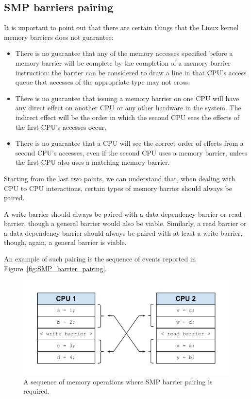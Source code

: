 \subsection{SMP barriers pairing}

It is important to point out that there are certain things that the Linux kernel memory
barriers does not guarantee:

\begin{itemize}
\item There is no guarantee that any of the memory accesses specified before a memory barrier
will be complete by the completion of a memory barrier instruction: the barrier can be
considered to draw a line in that CPU's access queue that accesses of the appropriate type
may not cross.
\item There is no guarantee that issuing a memory barrier on one CPU will have any direct
effect on another CPU or any other hardware in the system. The indirect effect will be the
order in which the second CPU sees the effects of the first CPU's accesses occur.
\item There is no guarantee that a CPU will see the correct order of effects from a second
CPU's accesses, even if the second CPU uses a memory barrier, unless the first CPU also
uses a matching memory barrier.
\end{itemize}

Starting from the last two points, we can understand that, when dealing with CPU to CPU 
interactions, certain types of memory barrier should always be paired.

A write barrier should always be paired with a data dependency barrier or read barrier,
though a general barrier would also be viable. Similarly, a read barrier or a data
dependency barrier should always be paired with at least a write barrier, though,
again, a general barrier is viable.

An example of such pairing is the sequence of events reported in 
Figure~\vref{fig:SMP_barrier_pairing}.

\begin{figure}[htbp]
    \includegraphics[width=\columnwidth]{images/SMP_barrier_pairing}
    \caption{A sequence of memory operations where SMP barrier pairing is required.}
    \label{fig:SMP_barrier_pairing}
\end{figure}

